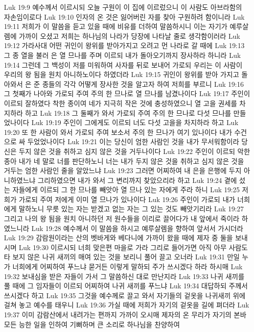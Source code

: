 Luk 19:9  예수께서 이르시되 오늘 구원이 이 집에 이르렀으니 이 사람도 아브라함의 자손임이로다
Luk 19:10  인자의 온 것은 잃어버린 자를 찾아 구원하려 함이니라
Luk 19:11  저희가 이 말씀을 듣고 있을 때에 비유를 더하여 말씀하시니 이는 자기가 예루살렘에 가까이 오셨고 저희는 하나님의 나라가 당장에 나타날 줄로 생각함이러라
Luk 19:12  가라사대 어떤 귀인이 왕위를 받아가지고 오려고 먼 나라로 갈 때에
Luk 19:13  그 종 열을 불러 은 열 므나를 주며 이르되 내가 돌아오기까지 장사하라 하니라
Luk 19:14  그런데 그 백성이 저를 미워하여 사자를 뒤로 보내어 가로되 우리는 이 사람이 우리의 왕 됨을 원치 아니하노이다 하였더라
Luk 19:15  귀인이 왕위를 받아 가지고 돌아와서 은 준 종들의 각각 어떻게 장사한 것을 알고자 하여 저희를 부르니
Luk 19:16  그 첫째가 나아와 가로되 주여 주의 한 므나로 열 므나를 남겼나이다
Luk 19:17  주인이 이르되 잘하였다 착한 종이여 네가 지극히 작은 것에 충성하였으니 열 고을 권세를 차지하라 하고
Luk 19:18  그 둘째가 와서 가로되 주여 주의 한 므나로 다섯 므나를 만들었나이다
Luk 19:19  주인이 그에게도 이르되 너도 다섯 고을을 차지하라 하고
Luk 19:20  또 한 사람이 와서 가로되 주여 보소서 주의 한 므나가 여기 있나이다 내가 수건으로 싸 두었었나이다
Luk 19:21  이는 당신이 엄한 사람인 것을 내가 무서워함이라 당신은 두지 않은 것을 취하고 심지 않은 것을 거두나이다
Luk 19:22  주인이 이르되 악한 종아 내가 네 말로 너를 판단하노니 너는 내가 두지 않은 것을 취하고 심지 않은 것을 거두는 엄한 사람인 줄을 알았느냐
Luk 19:23  그러면 어찌하여 내 은을 은행에 두지 아니하였느냐 그리하였으면 내가 와서 그 변리까지 찾았으리라 하고
Luk 19:24  곁에 섰는 자들에게 이르되 그 한 므나를 빼앗아 열 므나 있는 자에게 주라 하니
Luk 19:25  저희가 가로되 주여 저에게 이미 열 므나가 있나이다
Luk 19:26  주인이 가로되 내가 너희에게 말하노니 무릇 있는 자는 받겠고 없는 자는 그 있는 것도 빼앗기리라
Luk 19:27  그리고 나의 왕 됨을 원치 아니하던 저 원수들을 이리로 끌어다가 내 앞에서 죽이라 하였느니라
Luk 19:28  예수께서 이 말씀을 하시고 예루살렘을 향하여 앞서서 가시더라
Luk 19:29  감람원이라는 산의 벳바게와 베다니에 가까이 왔을 때에 제자 중 둘을 보내시며
Luk 19:30  이르시되 너희 맞은편 마을로 가라 그리로 들어가면 아직 아무 사람도 타 보지 않은 나귀 새끼의 매여 있는 것을 보리니 풀어 끌고 오너라
Luk 19:31  만일 누가 너희에게 어찌하여 푸느냐 묻거든 이렇게 말하되 주가 쓰시겠다 하라 하시매
Luk 19:32  보내심을 받은 자들이 가서 그 말씀하신 대로 만난지라
Luk 19:33  나귀 새끼를 풀 때에 그 임자들이 이르되 어찌하여 나귀 새끼를 푸느냐
Luk 19:34  대답하되 주께서 쓰시겠다 하고
Luk 19:35  그것을 예수께로 끌고 와서 자기들의 겉옷을 나귀새끼 위에 걸쳐 놓고 예수를 태우니
Luk 19:36  가실 때에 저희가 자기의 겉옷을 길에 펴더라
Luk 19:37  이미 감람산에서 내려가는 편까지 가까이 오시매 제자의 온 무리가 자기의 본바 모든 능한 일을 인하여 기뻐하며 큰 소리로 하나님을 찬양하여

